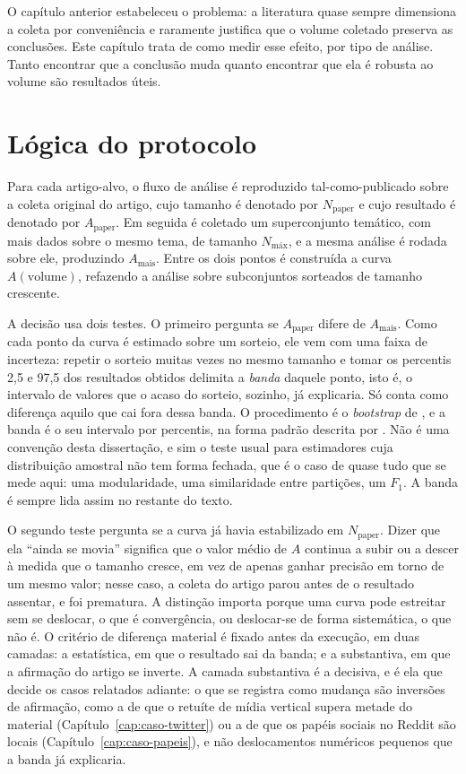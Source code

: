 O capítulo anterior estabeleceu o problema: a literatura quase sempre dimensiona a
coleta por conveniência e raramente justifica que o volume coletado preserva as
conclusões. Este capítulo trata de como medir esse efeito, por tipo de análise. Tanto
encontrar que a conclusão muda quanto encontrar que ela é robusta ao volume são
resultados úteis.

\section{Lógica do protocolo}

Para cada artigo-alvo, o fluxo de análise é reproduzido tal-como-publicado sobre a
coleta original do artigo, cujo tamanho é denotado por $N_{\text{paper}}$ e cujo
resultado é denotado por $A_{\text{paper}}$. Em seguida é coletado um superconjunto
temático, com mais dados sobre o mesmo tema, de tamanho $N_{\text{máx}}$, e a mesma
análise é rodada sobre ele, produzindo $A_{\text{mais}}$. Entre os dois pontos é
construída a curva $A(\text{volume})$, refazendo a análise sobre subconjuntos
sorteados de tamanho crescente.

A decisão usa dois testes. O primeiro pergunta se $A_{\text{paper}}$ difere de
$A_{\text{mais}}$. Como cada ponto da curva é estimado sobre um sorteio, ele vem
com uma faixa de incerteza: repetir o sorteio muitas vezes no mesmo tamanho e
tomar os percentis 2,5 e 97,5 dos resultados obtidos delimita a \emph{banda}
daquele ponto, isto é, o intervalo de valores que o acaso do sorteio, sozinho, já
explicaria. Só conta como diferença aquilo que cai fora dessa banda. O
procedimento é o \emph{bootstrap} de , e a
banda é o seu intervalo por percentis, na forma padrão descrita por
. Não é uma convenção desta dissertação, e sim o
teste usual para estimadores cuja distribuição amostral não tem forma fechada, que
é o caso de quase tudo que se mede aqui: uma modularidade, uma similaridade entre
partições, um $F_1$. A banda é sempre lida assim no restante do texto.

O segundo teste pergunta se a curva já havia estabilizado em $N_{\text{paper}}$.
Dizer que ela ``ainda se movia'' significa que o valor médio de $A$ continua a subir
ou a descer à medida que o tamanho cresce, em vez de apenas ganhar precisão em torno
de um mesmo valor; nesse caso, a coleta do artigo parou antes de o resultado
assentar, e foi prematura. A distinção importa porque uma curva pode estreitar sem
se deslocar, o que é convergência, ou deslocar-se de forma sistemática, o que não é.
O critério de diferença material é fixado antes da execução, em duas camadas: a
estatística, em que o resultado sai da banda; e a substantiva, em que a afirmação
do artigo se inverte. A camada substantiva é a decisiva, e é ela que decide os
casos relatados adiante: o que se registra como mudança são inversões de
afirmação, como a de que o retuíte de mídia vertical supera metade do material
(Capítulo~\ref{cap:caso-twitter}) ou a de que os papéis sociais no Reddit são
locais (Capítulo~\ref{cap:caso-papeis}), e não deslocamentos numéricos pequenos que
a banda já explicaria.

